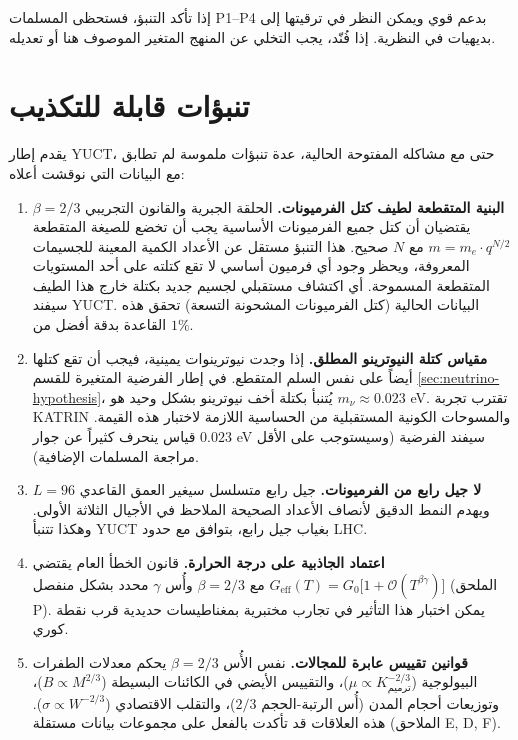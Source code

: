 \documentclass[12pt,a4paper]{article}
\begin{document}
	إذا تأكد التنبؤ، فستحظى المسلمات P1--P4 بدعم قوي ويمكن النظر في ترقيتها إلى بديهيات في النظرية. إذا فُنّد، يجب التخلي عن المنهج المتغير الموصوف هنا أو تعديله.
	
	\section{تنبؤات قابلة للتكذيب}
	
	يقدم إطار YUCT، حتى مع مشاكله المفتوحة الحالية، عدة تنبؤات ملموسة لم تطابق مع البيانات التي نوقشت أعلاه:
	
	\begin{enumerate}[label=(\arabic*)]
		\item \textbf{البنية المتقطعة لطيف كتل الفرميونات.} الحلقة الجبرية والقانون التجريبي \(\beta = 2/3\) يقتضيان أن كتل جميع الفرميونات الأساسية يجب أن تخضع للصيغة المتقطعة \(m = m_e \cdot q^{N/2}\) مع \(N\) صحيح. هذا التنبؤ مستقل عن الأعداد الكمية المعينة للجسيمات المعروفة، ويحظر وجود أي فرميون أساسي لا تقع كتلته على أحد المستويات المتقطعة المسموحة. أي اكتشاف مستقبلي لجسيم جديد بكتلة خارج هذا الطيف سيفند YUCT. البيانات الحالية (كتل الفرميونات المشحونة التسعة) تحقق هذه القاعدة بدقة أفضل من \(1\%\).
		\item \textbf{مقياس كتلة النيوترينو المطلق.} إذا وجدت نيوترينوات يمينية، فيجب أن تقع كتلها أيضاً على نفس السلم المتقطع. في إطار الفرضية المتغيرة للقسم \ref{sec:neutrino-hypothesis}، يُتنبأ بكتلة أخف نيوترينو بشكل وحيد هو \(m_{\nu} \approx 0.023\) eV. تقترب تجربة KATRIN والمسوحات الكونية المستقبلية من الحساسية اللازمة لاختبار هذه القيمة. قياس ينحرف كثيراً عن جوار \(0.023\) eV سيفند الفرضية (وسيستوجب على الأقل مراجعة المسلمات الإضافية).
		\item \textbf{لا جيل رابع من الفرميونات.} جيل رابع متسلسل سيغير العمق القاعدي \(L = 96\) ويهدم النمط الدقيق لأنصاف الأعداد الصحيحة الملاحظ في الأجيال الثلاثة الأولى. وهكذا تتنبأ YUCT بغياب جيل رابع، بتوافق مع حدود LHC.
		\item \textbf{اعتماد الجاذبية على درجة الحرارة.} قانون الخطأ العام يقتضي \(G_{\mathrm{eff}}(T) = G_0\bigl[1 + \mathcal{O}(T^{\beta\gamma})\bigr]\) مع \(\beta = 2/3\) وأُس \(\gamma\) محدد بشكل منفصل (الملحق P). يمكن اختبار هذا التأثير في تجارب مختبرية بمغناطيسات حديدية قرب نقطة كوري.
		\item \textbf{قوانين تقييس عابرة للمجالات.} نفس الأُس \(\beta = 2/3\) يحكم معدلات الطفرات البيولوجية (\(\mu \propto K_{\text{ترميم}}^{-2/3}\))، والتقييس الأيضي في الكائنات البسيطة (\(B \propto M^{2/3}\))، وتوزيعات أحجام المدن (أُس الرتبة-الحجم \(2/3\))، والتقلب الاقتصادي (\(\sigma \propto W^{-2/3}\)). هذه العلاقات قد تأكدت بالفعل على مجموعات بيانات مستقلة (الملاحق E, D, F).
	\end{enumerate}
	
\end{document}
